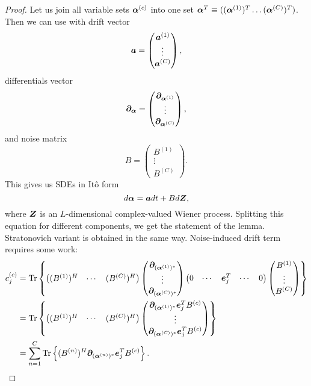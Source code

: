 \begin{proof}
Let us join all variable sets $\boldsymbol{\alpha}^{(c)}$ into one set $\boldsymbol{\alpha}^T \equiv ((\boldsymbol{\alpha}^{(1)})^T \ldots (\boldsymbol{\alpha}^{(C)})^T)$.
Then we can use  with drift vector
\[
	\boldsymbol{a} = \begin{pmatrix}
		\boldsymbol{a}^{(1)} \\ \vdots \\ \boldsymbol{a}^{(C)}
	\end{pmatrix},
\]
differentials vector
\[
	\boldsymbol{\partial}_{\boldsymbol{\alpha}} = \begin{pmatrix}
		\boldsymbol{\partial}_{\boldsymbol{\alpha}^{(1)}} \\ \vdots \\ \boldsymbol{\partial}_{\boldsymbol{\alpha}^{(C)}}
	\end{pmatrix},
\]
and noise matrix
\[
	B = \begin{pmatrix}
		B^{(1)} \\ \vdots \\ B^{(C)}
	\end{pmatrix}.
\]
This gives us SDEs in It\^{o} form
\[
	d\boldsymbol{\alpha} = \boldsymbol{a} dt + B d\boldsymbol{Z},
\]
where $\boldsymbol{Z}$ is an $L$-dimensional complex-valued Wiener process.
Splitting this equation for different components, we get the statement of the lemma.
Stratonovich variant is obtained in the same way.
Noise-induced drift term requires some work:
\begin{equation*}
\begin{split}
	c_j^{(c)}
	& = \mathrm{Tr} \left\{ 
		\begin{pmatrix} (B^{(1)})^H & \cdots & (B^{(C)})^H \end{pmatrix}
		\begin{pmatrix}
			\boldsymbol{\partial}_{(\boldsymbol{\alpha}^{(1)})^*} \\
			\vdots \\
			\boldsymbol{\partial}_{(\boldsymbol{\alpha}^{(C)})^*}
		\end{pmatrix}
		\begin{pmatrix} 0 & \cdots & \boldsymbol{e}_j^T & \cdots & 0 \end{pmatrix}
		\begin{pmatrix}
			B^{(1)} \\
			\vdots \\
			B^{(C)}
		\end{pmatrix}
	 \right\} \\
	& = \mathrm{Tr} \left\{ 
		\begin{pmatrix} (B^{(1)})^H & \cdots & (B^{(C)})^H \end{pmatrix}
		\begin{pmatrix}
			\boldsymbol{\partial}_{(\boldsymbol{\alpha}^{(1)})^*} \boldsymbol{e}_j^T B^{(c)} \\
			\vdots \\
			\boldsymbol{\partial}_{(\boldsymbol{\alpha}^{(C)})^*} \boldsymbol{e}_j^T B^{(c)}
		\end{pmatrix}
	 \right\} \\
	& = \sum_{n=1}^C \mathrm{Tr} \left\{ 
		(B^{(n)})^H
		\boldsymbol{\partial}_{(\boldsymbol{\alpha}^{(n)})^*}
		\boldsymbol{e}_j^T
		B^{(c)}
	 \right\}.
\end{split}
\end{equation*}
\end{proof}

